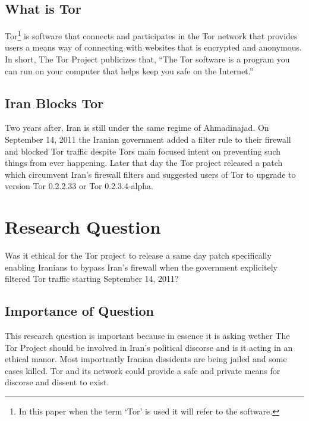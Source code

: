\documentclass[11pt]{article}
\begin{document}
\begin{multicols}{2}
\subsection{What is Tor}

Tor\footnote{In this paper when the term `Tor' is used it will refer to the
software.} is software that connects and participates in the Tor network that
provides users a means way of connecting with websites that is encrypted and
anonymous. In short, The Tor Project publicizes that, ``The Tor software is a
program you can run on your computer that helps keep you safe on the
Internet.''\cite{Tor:FAQ} 

\subsection{Iran Blocks Tor}

Two years after, Iran is still under the same regime of Ahmadinajad.  On
September 14, 2011 the Iranian government added a filter rule to their firewall
and blocked Tor traffic despite Tors main focused intent on preventing such
things from ever happening. \cite{IranBlocksTorSameDayFix}  Later that day the
Tor project released a patch which circumvent Iran's firewall filters and
suggested users of Tor to upgrade to version Tor 0.2.2.33 or Tor
0.2.3.4-alpha.\cite{IranBlocksTorSameDayFix}

\section{Research Question} 
Was it ethical for the Tor project to release a same day patch specifically
enabling Iranians to bypass Iran's firewall when the government explicitely
filtered Tor traffic starting September 14, 2011?

\subsection{Importance of Question}

This research question is important because in essence it is asking wether The
Tor Project should be involved in Iran's political discorse and is it acting in
an ethical manor. Most importnatly Iranian dissidents are being jailed and some
cases killed.\cite{IranBloggersDeath} Tor and its network could provide a safe
and private means for discorse and dissent to exist.



\end{multicols}
\end{document}

